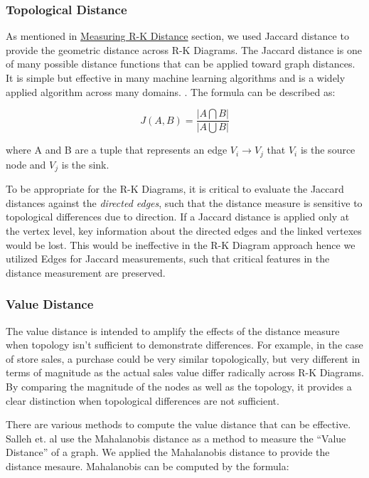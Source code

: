 \subsubsection{Topological Distance}
\label{subsec:topological_distance}

As mentioned in \hyperref[sec:rk_distance]{Measuring R-K Distance} section, we used Jaccard distance to provide the geometric distance across R-K Diagrams. The Jaccard distance is one of many possible distance functions that can be applied toward graph distances. It is simple but effective in many machine learning algorithms and is a widely applied algorithm across many domains. \cite{roughgarden_valiant_2021}. The formula can be described as:

\begin{equation}
J(A,B) = \frac{| A \bigcap B |}{| A \bigcup B |}
\end{equation}

where A and B are a tuple that represents an edge $V_{i} \to V_{j}$ that $V_{i}$ is the source node and $V_{j}$ is the sink.

To be appropriate for the R-K Diagrams, it is critical to evaluate the Jaccard distances against the \textit{directed edges}, such that the distance measure is sensitive to topological differences due to direction. If a Jaccard distance is applied only at the vertex level, key information about the directed edges and the linked vertexes would be lost. This would be ineffective in the R-K Diagram approach hence we utilized Edges for Jaccard measurements, such that critical features in the distance measurement are preserved.

\subsubsection{Value Distance}
\label{subsec:valuedistance}

The value distance is intended to amplify the effects of the distance measure when topology isn't sufficient to demonstrate differences. For example, in the case of store sales, a purchase could be very similar topologically, but very different in terms of magnitude as the actual sales value differ radically across R-K Diagrams. By comparing the magnitude of the nodes as well as the topology, it provides a clear distinction when topological differences are not sufficient.

There are various methods to compute the value distance that can be effective. Salleh et. al use the Mahalanobis distance as a method to measure the ``Value Distance'' of a graph.  We applied the Mahalanobis distance to provide the distance mesaure. Mahalanobis can be computed by the formula: \cite{Salleh1_et_al}

